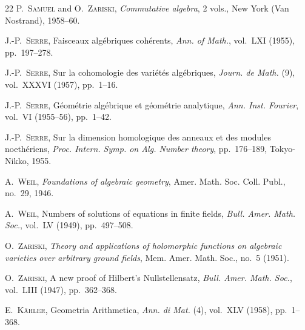 \begin{thebibliography}{22}
P.~\textsc{Samuel} and O.~\textsc{Zariski},
\emph{Commutative algebra}, 2 vols., New York (Van Nostrand), 1958--60.

J.-P.~\textsc{Serre}, Faisceaux algébriques cohérents,
\emph{Ann. of Math.}, vol.~LXI (1955), pp.~197--278.

J.-P.~\textsc{Serre},
Sur la cohomologie des variétés algébriques,
\emph{Journ. de Math.} (9), vol.~XXXVI (1957), pp.~1--16.

J.-P.~\textsc{Serre},
Géométrie algébrique et géométrie analytique,
\emph{Ann. Inst. Fourier}, vol.~VI (1955--56), pp.~1--42.

J.-P.~\textsc{Serre},
Sur la dimension homologique des anneaux et des modules noethériens,
\emph{Proc. Intern. Symp. on Alg. Number theory}, pp.~176--189, Tokyo-Nikko,
1955.

A.~\textsc{Weil}, \emph{Foundations of algebraic geometry}, Amer. Math. Soc.
Coll. Publ., no.~29, 1946.

A.~\textsc{Weil}, Numbers of solutions of equations in finite fields,
\emph{Bull. Amer. Math. Soc.}, vol.~LV (1949), pp.~497--508.

O.~\textsc{Zariski},
\emph{Theory and applications of holomorphic functions on algebraic varieties
over arbitrary ground fields}, Mem. Amer. Math. Soc., no.~5
(1951).

O.~\textsc{Zariski}, A new proof of Hilbert's Nullstellensatz,
\emph{Bull. Amer. Math. Soc.}, vol.~LIII (1947), pp.~362--368.

E.~\textsc{Kähler}, Geometria Arithmetica,
\emph{Ann. di Mat.} (4), vol.~XLV (1958), pp.~1--368.

\end{thebibliography}

